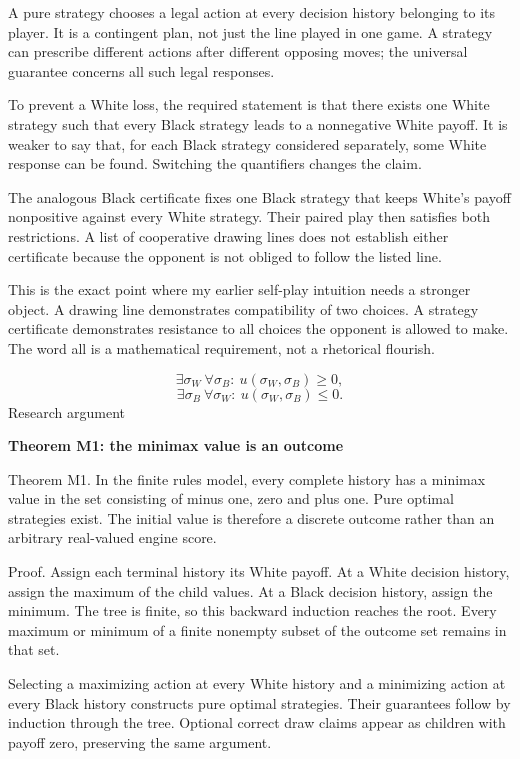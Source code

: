 \documentclass[10pt]{article}
\begin{document}
A pure strategy chooses a legal action at every decision history belonging to its player. It is a contingent plan, not just the line played in one game. A strategy can prescribe different actions after different opposing moves; the universal guarantee concerns all such legal responses.\par
To prevent a White loss, the required statement is that there exists one White strategy such that every Black strategy leads to a nonnegative White payoff. It is weaker to say that, for each Black strategy considered separately, some White response can be found. Switching the quantifiers changes the claim.\par
The analogous Black certificate fixes one Black strategy that keeps White's payoff nonpositive against every White strategy. Their paired play then satisfies both restrictions. A list of cooperative drawing lines does not establish either certificate because the opponent is not obliged to follow the listed line.\par
This is the exact point where my earlier self-play intuition needs a stronger object. A drawing line demonstrates compatibility of two choices. A strategy certificate demonstrates resistance to all choices the opponent is allowed to make. The word all is a mathematical requirement, not a rhetorical flourish.\par
\[\exists\sigma_W\ \forall\sigma_B:\ u(\sigma_W,\sigma_B)\geq0,\]
\[\exists\sigma_B\ \forall\sigma_W:\ u(\sigma_W,\sigma_B)\leq0.\]
\clearpage
{\small\color{accent}Research argument}\par
{\LARGE\bfseries\color{ink}Theorem M1: the minimax value is an outcome}\par\vspace{7pt}
Theorem M1. In the finite rules model, every complete history has a minimax value in the set consisting of minus one, zero and plus one. Pure optimal strategies exist. The initial value is therefore a discrete outcome rather than an arbitrary real-valued engine score.\par
Proof. Assign each terminal history its White payoff. At a White decision history, assign the maximum of the child values. At a Black decision history, assign the minimum. The tree is finite, so this backward induction reaches the root. Every maximum or minimum of a finite nonempty subset of the outcome set remains in that set.\par
Selecting a maximizing action at every White history and a minimizing action at every Black history constructs pure optimal strategies. Their guarantees follow by induction through the tree. Optional correct draw claims appear as children with payoff zero, preserving the same argument.\par
\end{document}
